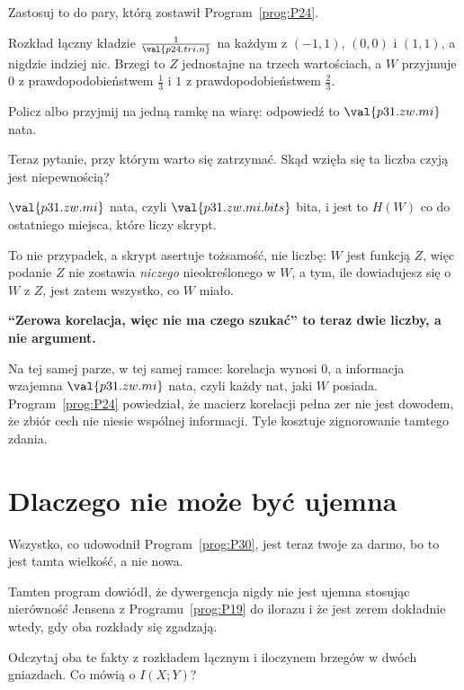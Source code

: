 \begin{fr}
Zastosuj to do pary, którą zostawił Program~\ref{prog:P24}.

Rozkład łączny kładzie $\frac{1}{\val{p24.tri.n}}$ na każdym z $(-1, 1)$,
$(0, 0)$ i $(1, 1)$, a nigdzie indziej nic. Brzegi to $Z$ jednostajne na
trzech wartościach, a $W$ przyjmuje $0$ z prawdopodobieństwem
$\frac{1}{3}$ i $1$ z prawdopodobieństwem $\frac{2}{3}$.

Policz albo przyjmij na jedną ramkę na wiarę: odpowiedź to
$\val{p31.zw.mi}$ nata.

Teraz pytanie, przy którym warto się zatrzymać. Skąd wzięła się ta liczba
\dash{} czyją jest niepewnością?
\dotline
\nextframe
\end{fr}

\begin{fr}

$\val{p31.zw.mi}$ nata, czyli $\val{p31.zw.mi.bits}$ bita, i jest to $H(W)$
co do ostatniego miejsca, które liczy skrypt.

To nie przypadek, a skrypt asertuje tożsamość, nie liczbę: $W$ jest funkcją
$Z$, więc podanie $Z$ nie zostawia \emph{niczego} nieokreślonego w $W$, a
tym, ile dowiadujesz się o $W$ z $Z$, jest zatem wszystko, co $W$ miało.

\begin{trapbox}
\textbf{\enquote{Zerowa korelacja, więc nie ma czego szukać} to teraz dwie
liczby, a nie argument.}

Na tej samej parze, w tej samej ramce: korelacja wynosi $0$, a informacja
wzajemna $\val{p31.zw.mi}$ nata, czyli każdy nat, jaki $W$ posiada.
Program~\ref{prog:P24} powiedział, że macierz korelacji pełna zer nie jest
dowodem, że zbiór cech nie niesie wspólnej informacji. Tyle kosztuje
zignorowanie tamtego zdania.
\end{trapbox}

\end{fr}

\section{Dlaczego nie może być ujemna}
\label{sec:P31-nonneg}

\begin{fr}
Wszystko, co udowodnił Program~\ref{prog:P30}, jest teraz twoje za darmo,
bo to jest tamta wielkość, a nie nowa.

Tamten program dowiódł, że dywergencja nigdy nie jest ujemna \dash{}
stosując nierówność Jensena z Programu~\ref{prog:P19} do ilorazu \dash{} i
że jest zerem dokładnie wtedy, gdy oba rozkłady się zgadzają.

Odczytaj oba te fakty z rozkładem łącznym i iloczynem brzegów w dwóch
gniazdach. Co mówią o $I(X; Y)$?
\dotline
\nextframe
\end{fr}

